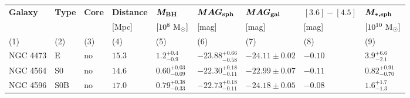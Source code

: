 \begin{table*}                                        
\small                                                
\begin{center}                                        
\begin{tabular}{lllllllll}                           
\hline                                                
\multicolumn{1}{l}{{\bf Galaxy}} &                   
\multicolumn{1}{l}{{\bf Type}} &                     
\multicolumn{1}{l}{{\bf Core}} &                     
\multicolumn{1}{l}{{\bf Distance}} &                 
\multicolumn{1}{l}{{\bf $\bm{M_{\rm BH}}$}} &  
\multicolumn{1}{l}{{\bf $\bm{MAG_{\rm sph}}$}} &  
\multicolumn{1}{l}{{\bf $\bm{MAG_{\rm gal}}$}} &  
\multicolumn{1}{l}{{\bf $\bm{[3.6]-[4.5]}$}} &  
\multicolumn{1}{l}{{\bf $\bm{M_{\rm *,sph}}$}} \\  
\multicolumn{1}{l}{} &                                
\multicolumn{1}{l}{} &                                
\multicolumn{1}{l}{} &                                
\multicolumn{1}{l}{[Mpc]} &                           
\multicolumn{1}{l}{$[10^8~\rm M_{\odot}]$} &         
\multicolumn{1}{l}{[mag]} &                                
\multicolumn{1}{l}{[mag]} &                                
\multicolumn{1}{l}{[mag]} &                                
\multicolumn{1}{l}{$[10^{10}~\rm M_{\odot}]$} \\                             
\multicolumn{1}{l}{(1)} &                             
\multicolumn{1}{l}{(2)} &                             
\multicolumn{1}{l}{(3)} &                             
\multicolumn{1}{l}{(4)} &                             
\multicolumn{1}{l}{(5)} &                             
\multicolumn{1}{l}{(6)} &                             
\multicolumn{1}{l}{(7)} &                             
\multicolumn{1}{l}{(8)} &                             
\multicolumn{1}{l}{(9)} \\                         
\hline                                                
NGC 4473  &  E  &  no   &  $15.3$  &  $1.2_{-0.9}^{+0.4}$   &  $-23.88_{-0.58}^{+0.66}$   &  $-24.11 \pm 0.02$   &  $-0.10$  &  $3.9_{-2.1}^{+6.6}$   \\ 
NGC 4564  &  S0  &  no   &  $14.6$  &  $0.60_{-0.09}^{+0.03}$   &  $-22.30_{-0.11}^{+0.18}$   &  $-22.99 \pm 0.07$   &  $-0.11$  &  $0.82_{-0.70}^{+0.91}$   \\ 
NGC 4596  &  S0B  &  no   &  $17.0$  &  $0.79_{-0.33}^{+0.38}$   &  $-22.73_{-0.11}^{+0.18}$   &  $-24.18 \pm 0.05$   &  $-0.08$  &  $1.6_{-1.3}^{+1.7}$   \\ 

\end{tabular}
\end{center}
\end{table*}
